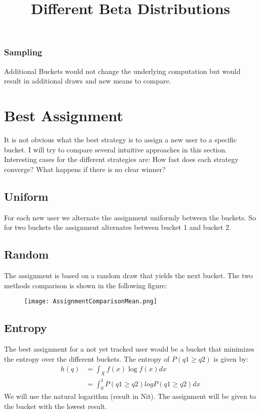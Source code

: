\documentclass[../Thesis.tex]{subfiles}
\begin{document}
\subsubsection{Sampling}
Additional Buckets would not change the underlying computation but would result in additional draws and new means to compare. 

\section{Best Assignment}
It is not obvious what the best strategy is to assign a new user to a specific bucket. I will try to compare several intuitive approaches in this section. Interesting cases for the different strategies are: How fast does each strategy converge? What happens if there is no clear winner?
\subsection{Uniform}
For each new user we alternate the assignment uniformly between the buckets. So for two buckets the assignment alternates between bucket 1 and bucket 2.
\subsection{Random}
The assignment is based on a random draw that yields the next bucket. The two methods comparison is shown in the following figure:
\begin{figure}[ht]
\texttt{[image: AssignmentComparisonMean.png]}
\centering
\title{Different Beta Distributions}
\end{figure}
\subsection{Entropy}
The best assignment for a not yet tracked user would be a bucket that minimizes the entropy over the different buckets. The entropy of $P(q1\geq q2)$ is given by:
\begin{align*}
h(q) 	&= \int_{X}f(x)\log f(x)dx \\
		&= \int_{0}^{1} P(q1\geq q2)log P(q1\geq q2)dx
\end{align*}
We will use the natural logarithm (result in Nit). The assignment will be given to the bucket with the lowest result.
\end{document}
